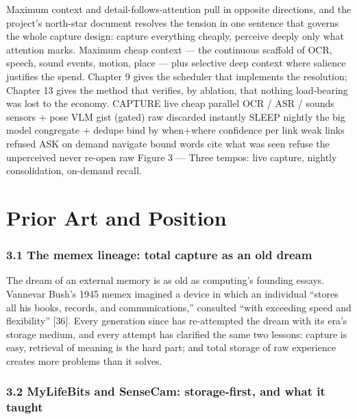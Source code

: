 Maximum context and detail-follows-attention pull in opposite directions, and the project's north-star document resolves the tension in one sentence that governs the whole capture design: capture everything cheaply, perceive deeply only what attention marks. Maximum cheap context --- the continuous scaffold of OCR, speech, sound events, motion, place --- plus selective deep context where salience justifies the spend. Chapter 9 gives the scheduler that implements the resolution; Chapter 13 gives the method that verifies, by ablation, that nothing load-bearing was lost to the economy. CAPTURE live \textperiodcentered{} cheap \textperiodcentered{} parallel \textperiodcentered{} OCR / ASR / sounds \textperiodcentered{} sensors + pose \textperiodcentered{} VLM gist (gated) \textperiodcentered{} raw discarded instantly SLEEP nightly \textperiodcentered{} the big model \textperiodcentered{} congregate + dedupe \textperiodcentered{} bind by when+where \textperiodcentered{} confidence per link \textperiodcentered{} weak links refused ASK on demand \textperiodcentered{} navigate bound words \textperiodcentered{} cite what was seen \textperiodcentered{} refuse the unperceived \textperiodcentered{} never re-open raw Figure 3 --- Three tempos: live capture, nightly consolidation, on-demand recall.

\chapter{Prior Art and Position}\label{prior-art-and-position}

\subsection{3.1 The memex lineage: total capture as an old dream}\label{the-memex-lineage-total-capture-as-an-old-dream}

The dream of an external memory is as old as computing's founding essays. Vannevar Bush's 1945 memex imagined a device in which an individual ``stores all his books, records, and communications,'' consulted ``with exceeding speed and flexibility'' {[}36{]}. Every generation since has re-attempted the dream with its era's storage medium, and every attempt has clarified the same two lessons: capture is easy, retrieval of meaning is the hard part; and total storage of raw experience creates more problems than it solves.

\subsection{3.2 MyLifeBits and SenseCam: storage-first, and what it taught}\label{mylifebits-and-sensecam-storage-first-and-what-it-taught}

